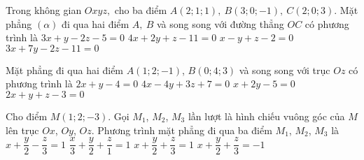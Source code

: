 \begin{ex}%
	Trong không gian $Oxyz,$ cho ba điểm $A(2;1;1),\ B(3;0;-1),\ C(2;0;3)$. Mặt phẳng $(\alpha)$ đi qua hai điểm $A,\ B$ và song song với đường thẳng $OC$ có phương trình là
	\choice
	{$3x+y-2z-5=0$}
	{$4x+2y+z-11=0$}
	{$x-y+z-2=0$}
	{\True $3x+7y-2z-11=0$}
\end{ex}
\begin{ex}
	Mặt phẳng đi qua hai điểm $A(1;2;-1)$, $B(0;4;3)$ và song song với trục $Oz$ có phương trình là
	\choice
	{\True $2x + y -4 =0$}
	{$4x - 4y +3 z+7 =0$}
	{$x + 2y -5=0$}
	{$2x + y+z -3 =0$}
\end{ex}

\begin{ex}%
	Cho điểm $M(1;2;-3)$. Gọi $M_{1}$, $M_{2}$, $M_{3}$ lần lượt là hình chiếu vuông góc của $M$ lên trục $Ox$, $Oy$, $Oz$. Phương trình mặt phẳng đi qua ba điểm $M_{1}$, $M_{2}$, $M_{3}$ là
	\choice
	{\True $x+\dfrac{y}{2}-\dfrac{z}{3}=1$}
	{$\dfrac{x}{3}+\dfrac{y}{2}+\dfrac{z}{1}=1$}
	{$x+\dfrac{y}{2}+\dfrac{z}{3}=1$}
	{$x+\dfrac{y}{2}+\dfrac{z}{3}=-1$}
\end{ex}

